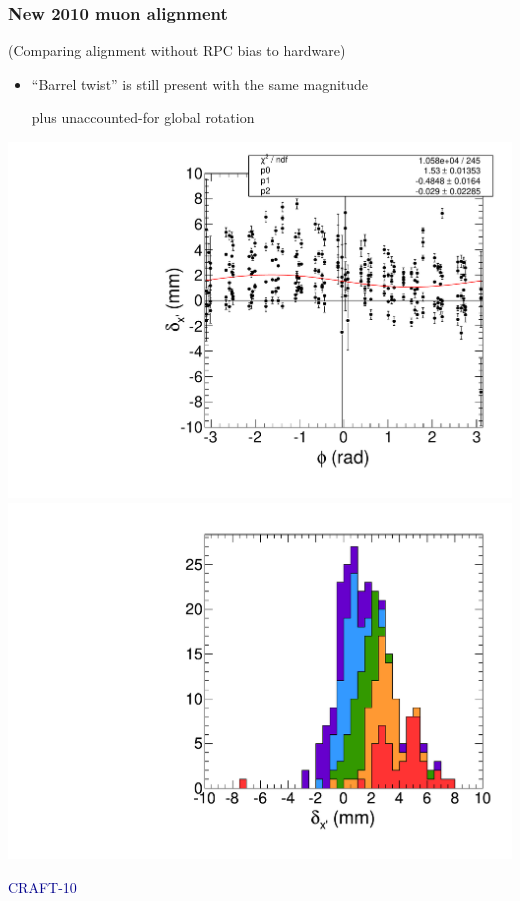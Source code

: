 \documentclass[compress]{beamer}
\begin{document}
\begin{frame}
\frametitle{New 2010 muon alignment}

(Comparing alignment without RPC bias to hardware)

\begin{itemize}
\item ``Barrel twist'' is still present with the same magnitude

plus unaccounted-for global rotation
\end{itemize}

\includegraphics[width=0.5\linewidth]{12_deltax_phi_without_RPC_and_hardware.pdf}
\includegraphics[width=0.5\linewidth]{13_deltax_stack_without_RPC_and_hardware.pdf}

\hfill \textcolor{darkblue}{\scriptsize CRAFT-10}
\end{frame}
\end{document}
